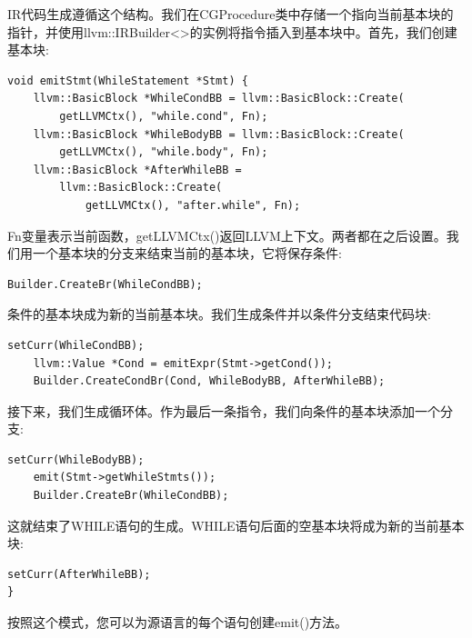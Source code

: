 IR代码生成遵循这个结构。我们在CGProcedure类中存储一个指向当前基本块的指针，并使用llvm::IRBuilder<>的实例将指令插入到基本块中。首先，我们创建基本块:\par

\begin{lstlisting}[caption={}]
void emitStmt(WhileStatement *Stmt) {
	llvm::BasicBlock *WhileCondBB = llvm::BasicBlock::Create(
		getLLVMCtx(), "while.cond", Fn);
	llvm::BasicBlock *WhileBodyBB = llvm::BasicBlock::Create(
		getLLVMCtx(), "while.body", Fn);
	llvm::BasicBlock *AfterWhileBB =
		llvm::BasicBlock::Create(
			getLLVMCtx(), "after.while", Fn);
\end{lstlisting}

Fn变量表示当前函数，getLLVMCtx()返回LLVM上下文。两者都在之后设置。我们用一个基本块的分支来结束当前的基本块，它将保存条件:\par

\begin{lstlisting}[caption={}]
	Builder.CreateBr(WhileCondBB);
\end{lstlisting}

条件的基本块成为新的当前基本块。我们生成条件并以条件分支结束代码块:\par

\begin{lstlisting}[caption={}]
	setCurr(WhileCondBB);
	llvm::Value *Cond = emitExpr(Stmt->getCond());
	Builder.CreateCondBr(Cond, WhileBodyBB, AfterWhileBB);
\end{lstlisting}

接下来，我们生成循环体。作为最后一条指令，我们向条件的基本块添加一个分支:\par

\begin{lstlisting}[caption={}]
	setCurr(WhileBodyBB);
	emit(Stmt->getWhileStmts());
	Builder.CreateBr(WhileCondBB);
\end{lstlisting}

这就结束了WHILE语句的生成。WHILE语句后面的空基本块将成为新的当前基本块:\par

\begin{lstlisting}[caption={}]
	setCurr(AfterWhileBB);
}
\end{lstlisting}

按照这个模式，您可以为源语言的每个语句创建emit()方法。\par





















